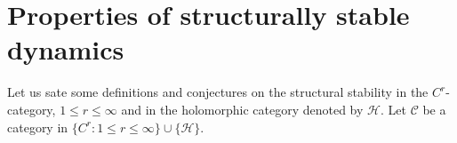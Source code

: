 \documentclass[11pt,openany,leqno]{article}
\begin{document}
%
%
%
%
%



\section{Properties of structurally stable dynamics}\label{partstabstruct}
\label{secStabimplieshyp}
Let us sate some definitions and conjectures on the structural stability in the $C^r$-category, $1\le r\le \infty$ and in the holomorphic category denoted by $\mathcal H$. 
Let $\mathcal C$ be a category in $\{C^r: 1\le r\le \infty\} \cup \{\mathcal H\}$. 
\end{document}
